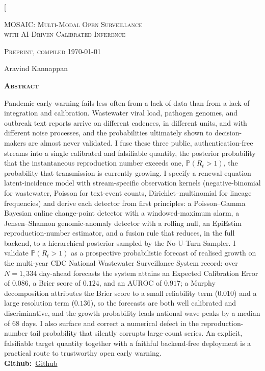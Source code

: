 \documentclass[10pt,twocolumn]{article}
\theoremstyle{definition}
\newcommand{\Rt}{R_t}
\newcommand{\Prob}{\mathbb{P}}
\newcommand{\github}{\href{https://github.com/aravinds-kannappan/MOSAIC}{Github}}
\begin{document}
\twocolumn[{%
\begin{center}
\vspace{2pt}
{\LARGE\scshape MOSAIC: Multi-Modal Open Surveillance\\[2pt]
with AI-Driven Calibrated Inference\par}
\vspace{8pt}
{\small\scshape Preprint, compiled \today\par}
\vspace{16pt}
{\large Aravind Kannappan\par}
\vspace{14pt}
\end{center}

\begin{center}{\scshape\bfseries Abstract}\end{center}
\begin{center}\begin{minipage}{0.86\textwidth}\small\noindent
Pandemic early warning fails less often from a lack of data than from a lack of
integration and calibration. Wastewater viral load, pathogen genomes, and
outbreak text reports arrive on different cadences, in different units, and with
different noise processes, and the probabilities ultimately shown to
decision-makers are almost never validated. I fuse these three public,
authentication-free streams into a single calibrated and falsifiable quantity,
the posterior probability that the instantaneous reproduction number exceeds one,
$\Prob(\Rt>1)$, the probability that transmission is currently growing. I specify
a renewal-equation latent-incidence model with stream-specific observation
kernels (negative-binomial for wastewater, Poisson for text-event counts,
Dirichlet--multinomial for lineage frequencies) and derive each detector from
first principles: a Poisson--Gamma Bayesian online change-point detector with a
windowed-maximum alarm, a Jensen--Shannon genomic-anomaly detector with a rolling
null, an EpiEstim reproduction-number estimator, and a fusion rule that reduces,
in the full backend, to a hierarchical posterior sampled by the No-U-Turn Sampler.
I validate $\Prob(\Rt>1)$ as a prospective probabilistic forecast of realised
growth on the multi-year CDC National Wastewater Surveillance System record: over
$N{=}1{,}334$ day-ahead forecasts the system attains an Expected Calibration Error
of $0.086$, a Brier score of $0.124$, and an AUROC of $0.917$; a Murphy
decomposition attributes the Brier score to a small reliability term ($0.010$) and
a large resolution term ($0.136$), so the forecasts are both well calibrated and
discriminative, and the growth probability leads national wave peaks by a median
of $68$ days. I also surface and correct a numerical defect in the
reproduction-number tail probability that silently corrupts large-count series. An
explicit, falsifiable target quantity together with a faithful backend-free
deployment is a practical route to trustworthy open early warning.
\\[6pt]
\textbf{Github:}~\github
\end{minipage}\end{center}
\vspace{8pt}

}
\end{document}
